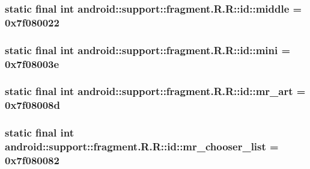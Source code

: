 \hypertarget{classandroid_1_1support_1_1fragment_1_1_r_1_1id_ab1ee5173b9b849243138b99d1b4b230}{
\subsubsection[{middle}]{\setlength{\rightskip}{0pt plus 5cm}static final int android::support::fragment.R.R::id::middle = 0x7f080022}}
\label{classandroid_1_1support_1_1fragment_1_1_r_1_1id_ab1ee5173b9b849243138b99d1b4b230}


\hypertarget{classandroid_1_1support_1_1fragment_1_1_r_1_1id_fdc83da9c03f76a6ca18fa6e084910a9}{
\subsubsection[{mini}]{\setlength{\rightskip}{0pt plus 5cm}static final int android::support::fragment.R.R::id::mini = 0x7f08003e}}
\label{classandroid_1_1support_1_1fragment_1_1_r_1_1id_fdc83da9c03f76a6ca18fa6e084910a9}


\hypertarget{classandroid_1_1support_1_1fragment_1_1_r_1_1id_e2f62a12f9ee734b232c4f0e3400520c}{
\subsubsection[{mr\_\-art}]{\setlength{\rightskip}{0pt plus 5cm}static final int android::support::fragment.R.R::id::mr\_\-art = 0x7f08008d}}
\label{classandroid_1_1support_1_1fragment_1_1_r_1_1id_e2f62a12f9ee734b232c4f0e3400520c}


\hypertarget{classandroid_1_1support_1_1fragment_1_1_r_1_1id_df9f3bdf33c1c669ab2f2a072cb1e43c}{
\subsubsection[{mr\_\-chooser\_\-list}]{\setlength{\rightskip}{0pt plus 5cm}static final int android::support::fragment.R.R::id::mr\_\-chooser\_\-list = 0x7f080082}}
\label{classandroid_1_1support_1_1fragment_1_1_r_1_1id_df9f3bdf33c1c669ab2f2a072cb1e43c}


